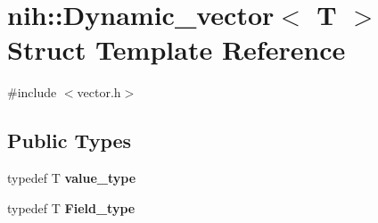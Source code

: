\hypertarget{structnih_1_1_dynamic__vector}{
\section{nih\-:\-:\-Dynamic\-\_\-vector$<$ \-T $>$ \-Struct \-Template \-Reference}
\label{structnih_1_1_dynamic__vector}
}


{\ttfamily \#include $<$vector.\-h$>$}

\subsection*{\-Public \-Types}
\begin{DoxyCompactItemize}
\item 
\hypertarget{structnih_1_1_dynamic__vector_aa461bd2c29680637f5ce89654a4c9ab0}{
typedef \-T {\bfseries value\-\_\-type}}
\label{structnih_1_1_dynamic__vector_aa461bd2c29680637f5ce89654a4c9ab0}

\item 
\hypertarget{structnih_1_1_dynamic__vector_a441fb60fc9a465ad29cafdf20c825985}{
typedef \-T {\bfseries \-Field\-\_\-type}}
\label{structnih_1_1_dynamic__vector_a441fb60fc9a465ad29cafdf20c825985}

\end{DoxyCompactItemize}
